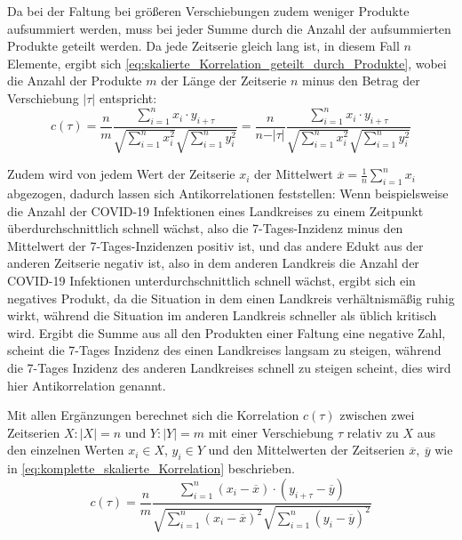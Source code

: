 Da bei der Faltung bei größeren Verschiebungen zudem weniger Produkte aufsummiert werden, muss bei jeder Summe durch die Anzahl der aufsummierten Produkte geteilt werden. Da jede Zeitserie gleich lang ist, in diesem Fall $n$ Elemente, ergibt sich \autoref{eq:skalierte_Korrelation_geteilt_durch_Produkte}, wobei die Anzahl der Produkte $m$ der Länge der Zeitserie $n$ minus den Betrag der Verschiebung $\vert\tau\vert$ entspricht:
\begin{equation}\label{eq:skalierte_Korrelation_geteilt_durch_Produkte}
    c(\tau) =\frac{n}{m} \frac{\sum_{i=1}^n x_i\cdot y_{i+\tau}}{\sqrt{\sum_{i=1}^n x_i^2}\sqrt{\sum_{i=1}^n y_i^2}}=
    \frac{n}{n-\vert\tau\vert} \frac{\sum_{i=1}^n x_i\cdot y_{i+\tau}}{\sqrt{\sum_{i=1}^n x_i^2}\sqrt{\sum_{i=1}^n y_i^2}}
\end{equation}

Zudem wird von jedem Wert der Zeitserie $x_i$ der Mittelwert $\overline x = \frac{1}{n}\sum_{i=1}^n x_i$ abgezogen, dadurch lassen sich Antikorrelationen feststellen: Wenn beispielsweise die Anzahl der COVID-19 Infektionen eines Landkreises zu einem Zeitpunkt überdurchschnittlich schnell wächst, also die 7-Tages-Inzidenz minus den Mittelwert der 7-Tages-Inzidenzen positiv ist, und das andere Edukt aus der anderen Zeitserie negativ ist, also in dem anderen Landkreis die Anzahl der COVID-19 Infektionen unterdurchschnittlich schnell wächst, ergibt sich ein negatives Produkt, da die Situation in dem einen Landkreis verhältnismäßig ruhig wirkt, während die Situation im anderen Landkreis schneller als üblich kritisch wird. Ergibt die Summe aus all den Produkten einer Faltung eine negative Zahl, scheint die 7-Tages Inzidenz des einen Landkreises langsam zu steigen, während die 7-Tages Inzidenz des anderen Landkreises schnell zu steigen scheint, dies wird hier Antikorrelation genannt.

Mit allen Ergänzungen berechnet sich die Korrelation $c(\tau)$ zwischen zwei Zeitserien $X:|X|=n$ und $Y:|Y|=m$ mit einer Verschiebung $\tau$ relativ zu $X$ aus den einzelnen Werten $x_i\in X$, $y_i \in Y$ und den Mittelwerten der Zeitserien $\overline x,\ \overline y$ wie in \autoref{eq:komplette_skalierte_Korrelation} beschrieben.
\begin{equation}\label{eq:komplette_skalierte_Korrelation}
    c(\tau) =\frac{n}{m}
    \frac{\sum_{i=1}^n (x_i-\overline x)\cdot (y_{i+\tau}-\overline y)}{\sqrt{\sum_{i=1}^n (x_i-\overline x)^2}\sqrt{\sum_{i=1}^n (y_i-\overline y)^2}}
\end{equation}

